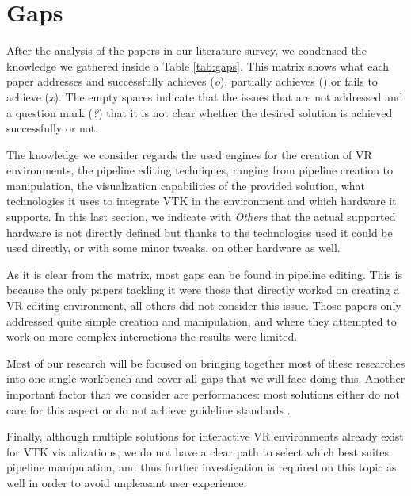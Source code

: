 \section{Gaps}\label{sec:gaps}

After the analysis of the papers in our literature survey, we condensed the knowledge we gathered inside a Table \ref{tab:gaps}. This matrix shows what each paper addresses and successfully achieves (\textit{o}), partially achieves (\textit{\texttildelow{}}) or fails to achieve (\textit{x}). The empty spaces indicate that the issues that are not addressed and a question mark (\textit{?}) that it is not clear whether the desired solution is achieved successfully or not.

The knowledge we consider regards the used engines for the creation of VR environments, the pipeline editing techniques, ranging from pipeline creation to manipulation, the visualization capabilities of the provided solution, what technologies it uses to integrate VTK in the environment and which hardware it supports. In this last section, we indicate with \textit{Others} that the actual supported hardware is not directly defined but thanks to the technologies used it could be used directly, or with some minor tweaks, on other hardware as well.

As it is clear from the matrix, most gaps can be found in pipeline editing. This is because the only papers tackling it were those that directly worked on creating a VR editing environment, all others did not consider this issue. Those papers only addressed quite simple creation and manipulation, and where they attempted to work on more complex interactions the results were limited.

Most of our research will be focused on bringing together most of these researches into one single workbench and cover all gaps that we will face doing this. Another important factor that we consider are performances: most solutions either do not care for this aspect or do not achieve guideline standards \cite{noauthor_vr_nodate-1, noauthor_virtual_nodate}.

Finally, although multiple solutions for interactive VR environments already exist for VTK visualizations, we do not have a clear path to select which best suites pipeline manipulation, and thus further investigation is required on this topic as well in order to avoid unpleasant user experience.


